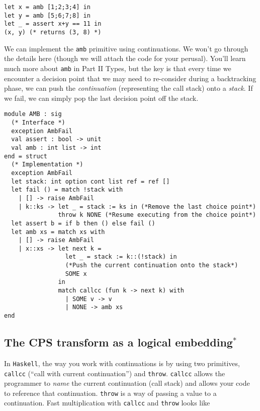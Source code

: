 \begin{code}
\label{code:amb-example}
\begin{verbatim}
let x = amb [1;2;3;4] in
let y = amb [5;6;7;8] in
let _ = assert x+y == 11 in
(x, y) (* returns (3, 8) *)
\end{verbatim}
\end{code}

We can implement the \texttt{amb} primitive using continuations. We won't go through the details here (though we will attach the code for your perusal). You'll learn much more about \texttt{amb} in {\sffamily Part II Types}, but the key is that every time we encounter a decision point that we may need to re-consider during a backtracking phase, we can push the \emph{continuation} (representing the call stack) onto a \emph{stack}. If we fail, we can simply pop the last decision point off the stack. 

\begin{code}
\label{code:amb-specification}
\begin{verbatim}
module AMB : sig
  (* Interface *)
  exception AmbFail
  val assert : bool -> unit
  val amb : int list -> int
end = struct
  (* Implementation *)
  exception AmbFail
  let stack: int option cont list ref = ref []
  let fail () = match !stack with
    | [] -> raise AmbFail
    | k::ks -> let _ = stack := ks in (*Remove the last choice point*)
               throw k NONE (*Resume executing from the choice point*)
  let assert b = if b then () else fail ()
  let amb xs = match xs with
    | [] -> raise AmbFail
    | x::xs -> let next k = 
                 let _ = stack := k::(!stack) in 
                 (*Push the current continuation onto the stack*)
                 SOME x
               in
               match callcc (fun k -> next k) with
                 | SOME v -> v 
                 | NONE -> amb xs 
end
\end{verbatim}
\end{code}

\subsection{The CPS transform as a logical embedding$^{*}$}
In \texttt{Haskell}, the way you work with continuations is by using two primitives, \texttt{callcc} (``call with current continuation'') and \texttt{throw}. \texttt{callcc} allows the programmer to \emph{name} the current continuation (call stack) and allows your code to reference that continuation. \texttt{throw} is a way of passing a value to a continuation. Fast multiplication with \texttt{callcc} and \texttt{throw} looks like


